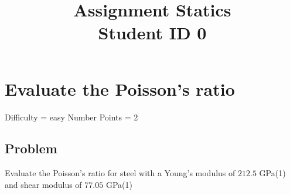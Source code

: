 \documentclass{article}
\title{Assignment Statics \\ Student ID 0}
\begin{document}
\maketitle

\section{Evaluate the Poisson's ratio}
Difficulty = easy
Number Points = 2
\subsection{Problem}
Evaluate the Poisson's ratio for steel with a Young's modulus of $212.5$ GPa(1) and shear modulus of $77.05$ GPa(1)
\vspace{6cm} 
\end{document}
